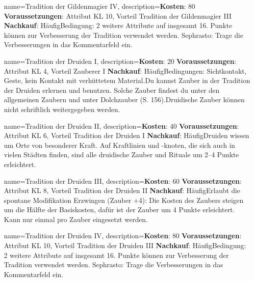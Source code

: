 {
    name={Tradition der Gildenmagier IV},
    description={\textbf{Kosten}: 80 \textbf{Voraussetzungen}: Attribut KL 10, Vorteil Tradition der Gildenmagier III \textbf{Nachkauf}: Häufig\newline Bedingung: 2 weitere Attribute auf insgesamt 16. Punkte können zur Verbesserung der Tradition verwendet werden. Sephrasto: Trage die Verbesserungen in das Kommentarfeld ein.}
}


{
    name={Tradition der Druiden I},
    description={\textbf{Kosten}: 20 \textbf{Voraussetzungen}: Attribut KL 4, Vorteil Zauberer I \textbf{Nachkauf}: Häufig\newline Bedingungen: Sichtkontakt, Geste, kein Kontakt mit verhüttetem Material.\newline Du kannst Zauber in der Tradition der Druiden erlernen und benutzen. Solche Zauber findest du unter den allgemeinen Zaubern und unter Dolchzauber (S. 156).\newline Druidische Zauber können nicht schriftlich weitergegeben werden.}
}


{
    name={Tradition der Druiden II},
    description={\textbf{Kosten}: 40 \textbf{Voraussetzungen}: Attribut KL 6, Vorteil Tradition der Druiden I \textbf{Nachkauf}: Häufig\newline Druiden wissen um Orte von besonderer Kraft. Auf Kraftlinien und -knoten, die sich auch in vielen Städten finden, sind alle druidische Zauber und Rituale um 2–4 Punkte erleichtert.}
}


{
    name={Tradition der Druiden III},
    description={\textbf{Kosten}: 60 \textbf{Voraussetzungen}: Attribut KL 8, Vorteil Tradition der Druiden II \textbf{Nachkauf}: Häufig\newline Erlaubt die spontane Modifikation Erzwingen (Zauber +4): Die Kosten des Zaubers steigen um die Hälfte der Basiskosten, dafür ist der Zauber um 4 Punkte erleichtert. Kann nur einmal pro Zauber eingesetzt werden.}
}


{
    name={Tradition der Druiden IV},
    description={\textbf{Kosten}: 80 \textbf{Voraussetzungen}: Attribut KL 10, Vorteil Tradition der Druiden III \textbf{Nachkauf}: Häufig\newline Bedingung: 2 weitere Attribute auf insgesamt 16. Punkte können zur Verbesserung der Tradition verwendet werden. Sephrasto: Trage die Verbesserungen in das Kommentarfeld ein.}
}


